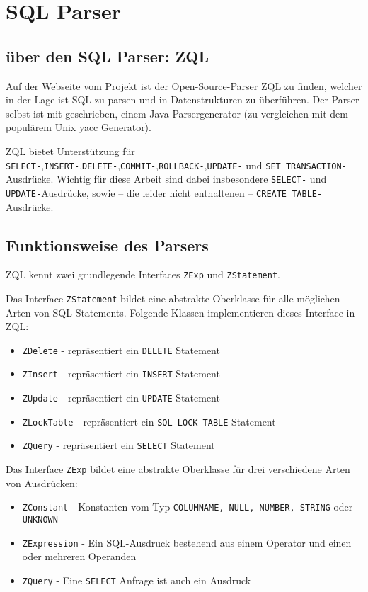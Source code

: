 \section{SQL Parser}

\subsection{über den SQL Parser: ZQL}

Auf der Webseite vom \cite{zql1} Projekt ist der Open-Source-Parser ZQL zu finden, welcher in der Lage ist SQL zu parsen und in Datenstrukturen zu überführen. Der Parser selbst ist mit \cite{javacc1} geschrieben, einem  Java-Parsergenerator (zu vergleichen mit dem populärem Unix yacc Generator).

ZQL bietet Unterstützung für \verb|SELECT-|,\verb|INSERT-|,\verb|DELETE-|,\verb|COMMIT-|,\verb|ROLLBACK-|,\verb|UPDATE-| und \verb|SET TRANSACTION-|Ausdrücke. Wichtig für diese Arbeit sind dabei insbesondere \verb|SELECT-| und \verb|UPDATE-|Ausdrücke, sowie -- die leider nicht enthaltenen -- \verb|CREATE TABLE-|Ausdrücke.

\subsection{Funktionsweise des Parsers}

ZQL kennt zwei grundlegende Interfaces \verb|ZExp| und \verb|ZStatement|. 

Das Interface \verb|ZStatement| bildet eine abstrakte Oberklasse für alle möglichen Arten von SQL-Statements. Folgende Klassen implementieren dieses Interface in ZQL:

\begin{itemize}
\item \verb|ZDelete| - repräsentiert ein \verb|DELETE| Statement
\item \verb|ZInsert| - repräsentiert ein \verb|INSERT| Statement
\item \verb|ZUpdate| - repräsentiert ein \verb|UPDATE| Statement
\item \verb|ZLockTable| - repräsentiert ein \verb|SQL LOCK TABLE| Statement
\item \verb|ZQuery| - repräsentiert ein \verb|SELECT| Statement
\end{itemize}

Das Interface \verb|ZExp| bildet eine abstrakte Oberklasse für drei verschiedene Arten von Ausdrücken:

\begin{itemize}
\item \verb|ZConstant| - Konstanten vom Typ \verb|COLUMNAME, NULL, NUMBER, STRING| oder \verb|UNKNOWN|
\item \verb|ZExpression| - Ein SQL-Ausdruck bestehend aus einem Operator und einen oder mehreren Operanden
\item \verb|ZQuery| - Eine \verb|SELECT| Anfrage ist auch ein Ausdruck
\end{itemize}

